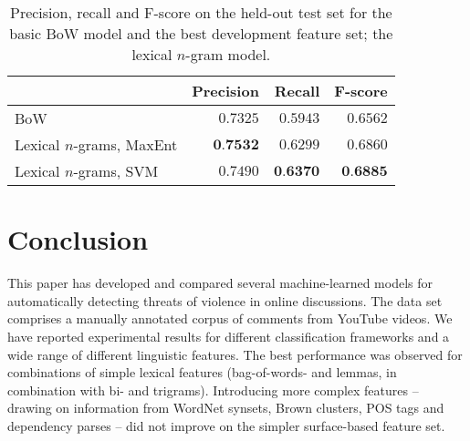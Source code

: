 \documentclass[11pt,letterpaper]{article}
\begin{document}
\begin{table}
\begin{smaller}
  \begin{center}
    \begin{tabular}{lrrr}
      \toprule      
      & Precision & Recall & F-score\\
      \midrule
      BoW & $0.7325$ & $0.5943$ & $0.6562$ \\
      Lexical $n$-grams, MaxEnt & $\textbf{0.7532}$ & $0.6299$ & $0.6860$  \\
      
      Lexical $n$-grams, SVM & $0.7490$ & $\textbf{0.6370}$ & $\textbf{0.6885}$  \\
      \bottomrule
    \end{tabular}
  \end{center}
  \caption{Precision, recall and F-score on the held-out test set for the basic BoW model and the best development feature set; the lexical $n$-gram model.}
  \label{tab:heldout}
\end{smaller}
\end{table}


\section{Conclusion}
\label{sec:conclusion}

This paper has developed and compared several machine-learned models for automatically detecting threats of violence in online discussions. The data set comprises a manually annotated corpus of comments from YouTube videos. We have reported experimental results for different classification frameworks and a wide range of different linguistic features. The best performance was observed for combinations of simple lexical features (bag-of-words- and lemmas, in combination with bi- and trigrams). Introducing more complex features -- drawing on information from WordNet synsets, Brown clusters, POS tags and dependency parses -- did not improve on the simpler surface-based feature set.




\end{document}
